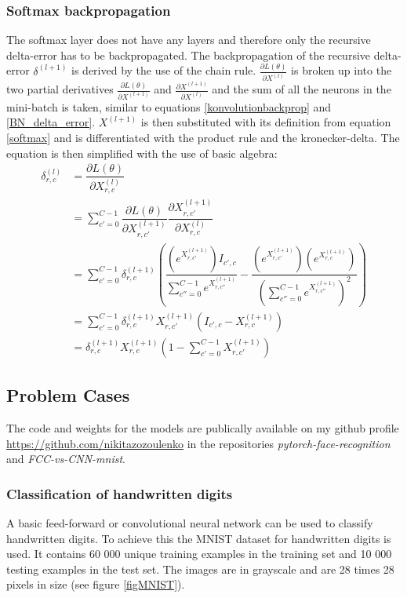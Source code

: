 \documentclass[a4paper,11pt,twoside]{article}
\newcommand*{\pd}[2]{\ensuremath{\dfrac{\partial #1}{\partial #2}}}
\newcommand*{\inpd}[2]{\ensuremath{\frac{\partial #1}{\partial #2}}}
\begin{document}
\subsubsection{Softmax backpropagation}
The softmax layer does not have any layers and therefore only the recursive delta-error has to be backpropagated. The backpropagation of the recursive delta-error $\delta^{(l+1)}$ is derived by the use of the chain rule. $\inpd{L(\theta)}{X^{(l)}}$ is broken up into the two partial derivatives $\inpd{L(\theta)}{X^{(l+1)}}$ and $\inpd{X^{(l+1)}}{X^{(l)}}$ and the sum of all the neurons in the mini-batch is taken, similar to equations \eqref{konvolutionbackprop} and \eqref{BN_delta_error}. $X^{(l+1)}$ is then substituted with its definition from equation \eqref{softmax} and is differentiated with the product rule and the kronecker-delta. The equation is then simplified with the use of basic algebra: \cite{cs231n} \cite{notesonbackprop} \cite{websoftmax} 
\begin{equation}
\begin{split}
\delta^{(l)}_{r,c}
		& = \pd{L(\theta)}{X^{(l)}_{r,c}} \\
		& = \sum^{C-1}_{c'=0} \pd{L(\theta)}{X^{(l+1)}_{r,c'}} \pd{X^{(l+1)}_{r,c'}}{X^{(l)}_{r,c}} \\
		& = \sum^{C-1}_{c'=0} \delta^{(l+1)}_{r,c} \left(  \dfrac{(e^{X^{(l+1)}_{r,c'}})I_{c',c}}{\sum^{C-1}_{c''=0}e^{X^{(l+1)}_{r,c''}}} - \dfrac{(e^{X^{(l+1)}_{r,c'}})(e^{X^{(l+1)}_{r,c}})}{(\sum^{C-1}_{c''=0}e^{X^{(l+1)}_{r,c''}})^2} \right) \\
		& = \sum^{C-1}_{c'=0}  \delta^{(l+1)}_{r,c} X^{(l+1)}_{r,c'}(I_{c',c}-X^{(l+1)}_{r,c}) \\
		& = \delta^{(l+1)}_{r,c} X^{(l+1)}_{r,c} \left( 1-\sum^{C-1}_{c'=0} X^{(l+1)}_{r,c'} \right)
\end{split}
\end{equation}

\subsection{Problem Cases}
The code and weights for the models are publically available on my github profile \url{https://github.com/nikitazozoulenko} in the repositories \textit{pytorch-face-recognition} and \textit{FCC-vs-CNN-mnist}.

\subsubsection{Classification of handwritten digits}
A basic feed-forward or convolutional neural network can be used to classify handwritten digits. To achieve this the MNIST dataset for handwritten digits is used. It contains 60 000 unique training examples in the training set and 10 000 testing examples in the test set. The images are in grayscale and are 28 times 28 pixels in size (see figure \ref{figMNIST}). \cite{MNIST}
\end{document}
